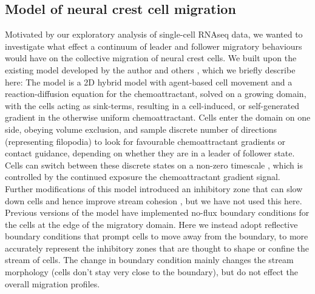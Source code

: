 \documentclass[review]{elsarticle}
\begin{document}
\subsection{Model of neural crest cell migration}%
Motivated by our exploratory analysis of single-cell RNAseq data, we wanted to investigate what effect a continuum of leader and follower migratory behaviours would have on the collective migration of neural crest cells. We built upon the existing model developed by the author and others \cite{McLennan2012,McLennan2015,McLennan2015b}, which we briefly describe here: The model is a 2D hybrid model with agent-based cell movement and a reaction-diffusion equation for the chemoattractant, solved on a growing domain, with the cells acting as sink-terms, resulting in a cell-induced, or self-generated gradient in the otherwise uniform chemoattractant. Cells enter the domain on one side, obeying volume exclusion, and sample discrete number of directions (representing filopodia) to look for favourable chemoattractant gradients or contact guidance, depending on whether they are in a leader of follower state. Cells can switch between these discrete states on a non-zero timescale \cite{McLennan2015b}, which is controlled by the continued exposure the chemoattractant gradient signal. Further modifications of this model introduced an inhibitory zone that can slow down cells and hence improve stream cohesion \cite{McLennan2017}, but we have not used this here. Previous versions of the model have implemented no-flux boundary conditions for the cells at the edge of the migratory domain. Here we instead adopt reflective boundary conditions that prompt cells to move away from the boundary, to more accurately represent the inhibitory zones  \cite{Kulesa2010,Szabo2016a} that are thought to shape or confine the stream of cells. The change in boundary condition mainly changes the stream morphology (cells don't stay very close to the boundary), but do not effect the overall migration profiles.
\end{document}
